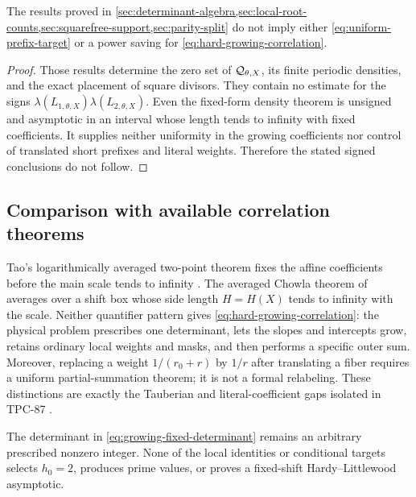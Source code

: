 \begin{proposition}
\label{prop:fixed-form-insufficient}
The results proved in
\cref{sec:determinant-algebra,sec:local-root-counts,sec:squarefree-support,sec:parity-split}
do not imply either \eqref{eq:uniform-prefix-target} or a power saving
for \eqref{eq:hard-growing-correlation}.
\end{proposition}

\begin{proof}
Those results determine the zero set of \(\mathcal Q_{\theta,X}\), its
finite periodic densities, and the exact placement of square
divisors.  They contain no estimate for the signs
\(\lambda(L_{1,\theta,X})\lambda(L_{2,\theta,X})\).  Even the
fixed-form density theorem is unsigned and asymptotic in an interval
whose length tends to infinity with fixed coefficients.  It supplies
neither uniformity in the growing coefficients nor control of
translated short prefixes and literal weights.  Therefore the stated
signed conclusions do not follow.
\end{proof}

\subsection{Comparison with available correlation theorems}

Tao's logarithmically averaged two-point theorem fixes the affine
coefficients before the main scale tends to infinity
\citep{Tao2016}.  The averaged Chowla theorem of
\citet{MatomakiRadziwillTao2015} averages over a shift box whose side
length \(H=H(X)\) tends to infinity with the scale.  Neither
quantifier pattern gives
\eqref{eq:hard-growing-correlation}: the physical problem prescribes
one determinant, lets the slopes and intercepts grow, retains
ordinary local weights and masks, and then performs a specific outer
sum.  Moreover, replacing a weight \(1/(r_0+r)\) by \(1/r\) after
translating a fiber requires a uniform partial-summation theorem; it
is not a formal relabeling.  These distinctions are exactly the
Tauberian and literal-coefficient gaps isolated in TPC-87
\citep{WangTPC87}.

\begin{remark}[No specialization]
\label{rem:no-specialization}
The determinant in \eqref{eq:growing-fixed-determinant} remains an
arbitrary prescribed nonzero integer.  None of the local identities
or conditional targets selects \(h_0=2\), produces prime values, or
proves a fixed-shift Hardy--Littlewood asymptotic.
\end{remark}
